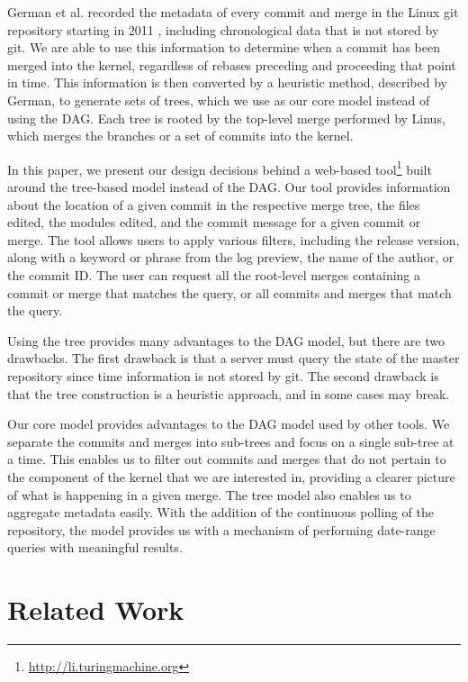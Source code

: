 \documentclass[conference, draftclsnofoot, draft]{IEEEtran}
\begin{document}

German et al. recorded the metadata of every commit and merge in the Linux git
repository starting in 2011 \cite{German2015}, including chronological data that is
not stored by git. We are able to use this information to determine when a commit
has been merged into the kernel, regardless of rebases preceding and proceeding that
point in time. This information is then converted by a heuristic method, described
by German, to generate sets of trees, which we use as our core model instead of
using the DAG. Each tree is rooted by the top-level merge performed by Linus, which
merges the branches or a set of commits into the kernel.

In this paper, we present our design decisions behind a web-based
tool\footnote{\url{http://li.turingmachine.org}} built around the tree-based model
instead of the DAG. Our tool provides information about the location of a given
commit in the respective merge tree, the files edited, the modules edited, and the
commit message for a given commit or merge. The tool allows users to apply various
filters, including the release version, along with a keyword or phrase from the log
preview, the name of the author, or the commit ID. The user can request all the
root-level merges containing a commit or merge that matches the query, or all
commits and merges that match the query.

Using the tree provides many advantages to the DAG model, but there are two
drawbacks. The first drawback is that a server must query the state of the master
repository since time information is not stored by git. The second drawback is that
the tree construction is a heuristic approach, and in some cases may break.

Our core model provides advantages to the DAG model used by other tools. We separate
the commits and merges into sub-trees and focus on a single sub-tree at a time. This
enables us to filter out commits and merges that do not pertain to the component of
the kernel that we are interested in, providing a clearer picture of what is
happening in a given merge. The tree model also enables us to aggregate metadata
easily. With the addition of the continuous polling of the repository, the model
provides us with a mechanism of performing date-range queries with meaningful
results.



\section{Related Work}
\end{document}
